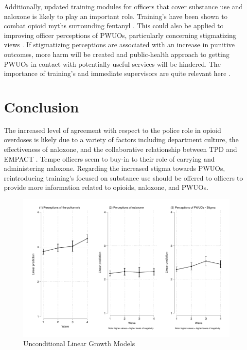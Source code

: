 Additionally, updated training modules for officers that cover substance use and naloxone is likely to play an important role. Training's have been shown to combat opioid myths surrounding fentanyl \parencite{del_pozo_can_2021}. This could also be applied to improving officer perceptions of PWUOs, particularly concerning stigmatizing views \parencite{winograd_concerns_2019}. If stigmatizing perceptions are associated with an increase in punitive outcomes, more harm will be created \parencite{binswanger_clinical_2016, ray_spatiotemporal_2023} and public-health approach to getting PWUOs in contact with potentially useful services will be hindered. The importance of training's and immediate supervisors are quite relevant here \parencite{del_pozo_police_2024}.  

\section{Conclusion}

The increased level of agreement with respect to the police role in opioid overdoses is likely due to a variety of factors including department culture, the effectiveness of naloxone, and the collaborative relationship between TPD and EMPACT \parencite{white_narcan_2021, white_moving_2021}. Tempe officers seem to buy-in to their role of carrying and administering naloxone. Regarding the increased stigma towards PWUOs, reintroducing training's focused on substance use should be offered to officers to provide more information related to opioids, naloxone, and PWUOs. 


\pagebreak


\begin{landscape}

\end{landscape}


\begin{figure}
    \centering
    \caption{\centering Unconditional Linear Growth Models}
    \includegraphics{figures/growth_models.pdf}
\end{figure}

